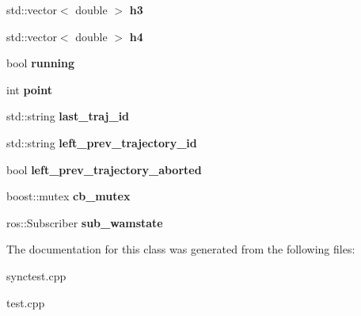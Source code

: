\begin{DoxyCompactItemize}
\item 
\hypertarget{classTest_a41b0137036f970569a1660e4cd33833c}{std\-::vector$<$ double $>$ {\bfseries h3}}\label{classTest_a41b0137036f970569a1660e4cd33833c}

\item 
\hypertarget{classTest_ae6140f3e3a315570e4dd24d0fd497472}{std\-::vector$<$ double $>$ {\bfseries h4}}\label{classTest_ae6140f3e3a315570e4dd24d0fd497472}

\item 
\hypertarget{classTest_ab1a06a178b7ea283afc81bb4fbbc7fcd}{bool {\bfseries running}}\label{classTest_ab1a06a178b7ea283afc81bb4fbbc7fcd}

\item 
\hypertarget{classTest_a1406e19d4417b07689fc8c9b2437bf06}{int {\bfseries point}}\label{classTest_a1406e19d4417b07689fc8c9b2437bf06}

\item 
\hypertarget{classTest_a89082cfad9bc7e799d0a84151d3d6857}{std\-::string {\bfseries last\-\_\-traj\-\_\-id}}\label{classTest_a89082cfad9bc7e799d0a84151d3d6857}

\item 
\hypertarget{classTest_aec8d4ca1b11bb82527cc3f164f4754d8}{std\-::string {\bfseries left\-\_\-prev\-\_\-trajectory\-\_\-id}}\label{classTest_aec8d4ca1b11bb82527cc3f164f4754d8}

\item 
\hypertarget{classTest_aa0ec3d5b369b11c410e5d77eaf62e912}{bool {\bfseries left\-\_\-prev\-\_\-trajectory\-\_\-aborted}}\label{classTest_aa0ec3d5b369b11c410e5d77eaf62e912}

\item 
\hypertarget{classTest_a50390162b0b92d02f8dac6a200c153e9}{boost\-::mutex {\bfseries cb\-\_\-mutex}}\label{classTest_a50390162b0b92d02f8dac6a200c153e9}

\item 
\hypertarget{classTest_ab8fdcb06fc37775aefe3642c03526a17}{ros\-::\-Subscriber {\bfseries sub\-\_\-wamstate}}\label{classTest_ab8fdcb06fc37775aefe3642c03526a17}

\end{DoxyCompactItemize}


The documentation for this class was generated from the following files\-:\begin{DoxyCompactItemize}
\item 
synctest.\-cpp\item 
test.\-cpp\end{DoxyCompactItemize}
